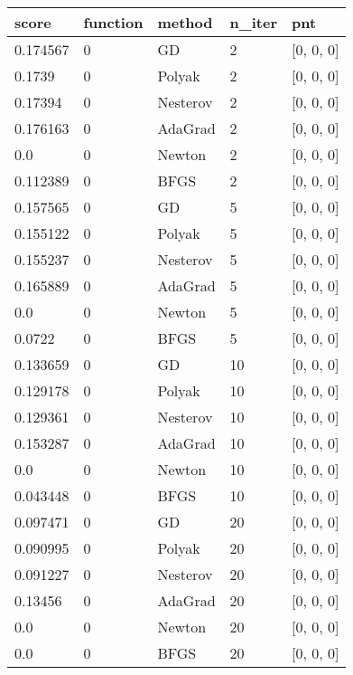 \begin{tabular}{lllll}
\toprule
     score & function &   method & n\_iter &              pnt \\
\midrule
  0.174567 &        0 &       GD &      2 &        [0, 0, 0] \\
    0.1739 &        0 &   Polyak &      2 &        [0, 0, 0] \\
   0.17394 &        0 & Nesterov &      2 &        [0, 0, 0] \\
  0.176163 &        0 &  AdaGrad &      2 &        [0, 0, 0] \\
       0.0 &        0 &   Newton &      2 &        [0, 0, 0] \\
  0.112389 &        0 &     BFGS &      2 &        [0, 0, 0] \\
  0.157565 &        0 &       GD &      5 &        [0, 0, 0] \\
  0.155122 &        0 &   Polyak &      5 &        [0, 0, 0] \\
  0.155237 &        0 & Nesterov &      5 &        [0, 0, 0] \\
  0.165889 &        0 &  AdaGrad &      5 &        [0, 0, 0] \\
       0.0 &        0 &   Newton &      5 &        [0, 0, 0] \\
    0.0722 &        0 &     BFGS &      5 &        [0, 0, 0] \\
  0.133659 &        0 &       GD &     10 &        [0, 0, 0] \\
  0.129178 &        0 &   Polyak &     10 &        [0, 0, 0] \\
  0.129361 &        0 & Nesterov &     10 &        [0, 0, 0] \\
  0.153287 &        0 &  AdaGrad &     10 &        [0, 0, 0] \\
       0.0 &        0 &   Newton &     10 &        [0, 0, 0] \\
  0.043448 &        0 &     BFGS &     10 &        [0, 0, 0] \\
  0.097471 &        0 &       GD &     20 &        [0, 0, 0] \\
  0.090995 &        0 &   Polyak &     20 &        [0, 0, 0] \\
  0.091227 &        0 & Nesterov &     20 &        [0, 0, 0] \\
   0.13456 &        0 &  AdaGrad &     20 &        [0, 0, 0] \\
       0.0 &        0 &   Newton &     20 &        [0, 0, 0] \\
       0.0 &        0 &     BFGS &     20 &        [0, 0, 0] \\

\end{tabular}
